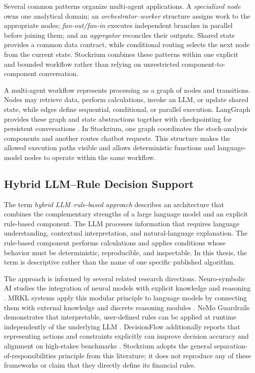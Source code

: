 Several common patterns organize multi-agent applications. A \textit{specialized node} owns one analytical domain; an \textit{orchestrator--worker} structure assigns work to the appropriate nodes; \textit{fan-out/fan-in} executes independent branches in parallel before joining them; and an \textit{aggregator} reconciles their outputs. Shared state provides a common data contract, while conditional routing selects the next node from the current state. Stockrium combines these patterns within one explicit and bounded workflow rather than relying on unrestricted component-to-component conversation.

A multi-agent workflow represents processing as a graph of nodes and transitions. Nodes may retrieve data, perform calculations, invoke an LLM, or update shared state, while edges define sequential, conditional, or parallel execution. LangGraph provides these graph and state abstractions together with checkpointing for persistent conversations \cite{langgraph2026graphapi}. In Stockrium, one graph coordinates the stock-analysis components and another routes chatbot requests. This structure makes the allowed execution paths visible and allows deterministic functions and language-model nodes to operate within the same workflow.

\subsection{Hybrid LLM--Rule Decision Support}
\label{subsec:hybrid-llm-rule-decision-support}

The term \textit{hybrid LLM--rule-based approach} describes an architecture that combines the complementary strengths of a large language model and an explicit rule-based component. The LLM processes information that requires language understanding, contextual interpretation, and natural-language explanation. The rule-based component performs calculations and applies conditions whose behavior must be deterministic, reproducible, and inspectable. In this thesis, the term is descriptive rather than the name of one specific published algorithm.

The approach is informed by several related research directions. Neuro-symbolic AI studies the integration of neural models with explicit knowledge and reasoning \cite{garcez2023neurosymbolic}. MRKL systems apply this modular principle to language models by connecting them with external knowledge and discrete reasoning modules \cite{karpas2022mrkl}. NeMo Guardrails demonstrates that interpretable, user-defined rules can be applied at runtime independently of the underlying LLM \cite{rebedea2023nemo}. DecisionFlow additionally reports that representing actions and constraints explicitly can improve decision accuracy and alignment on high-stakes benchmarks \cite{chen2025decisionflow}. Stockrium adopts the general separation-of-responsibilities principle from this literature; it does not reproduce any of these frameworks or claim that they directly define its financial rules.

